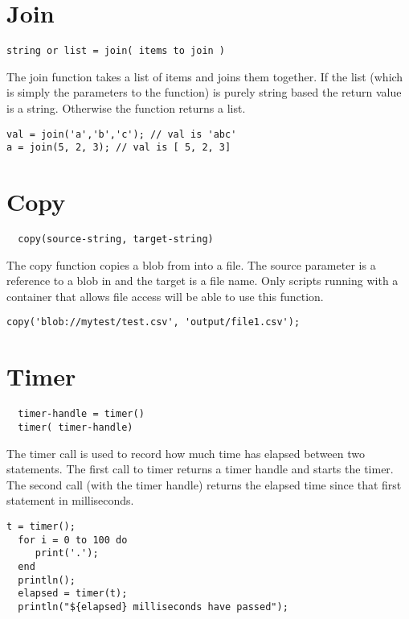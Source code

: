 \section{Join}
\begin{Verbatim}
string or list = join( items to join )
\end{Verbatim}

The join function takes a list of items and joins them together. If the
list (which is simply the parameters to the function) is purely string based the return
value is a string. Otherwise the function returns a list.

\begin{lstlisting}[caption={join example}]
val = join('a','b','c'); // val is 'abc'
a = join(5, 2, 3); // val is [ 5, 2, 3]
\end{lstlisting}


\section{Copy}
\begin{Verbatim}
  copy(source-string, target-string)
\end{Verbatim}

The copy function copies a blob from \Rapture into a file. The source parameter is
a reference to a blob in \Rapture and the target is a file name. Only scripts running
with a container that allows file access will be able to use this function.

\begin{lstlisting}[caption={copy example}]
copy('blob://mytest/test.csv', 'output/file1.csv');
\end{lstlisting}

\section{Timer}
\begin{Verbatim}
  timer-handle = timer()
  timer( timer-handle)
\end{Verbatim}

The timer call is used to record how much time has elapsed between two
\Reflex statements. The first call to timer returns a timer handle and starts
the timer. The second call (with the timer handle) returns the elapsed time since
that first statement in milliseconds.

\begin{lstlisting}[caption={timer example}]
  t = timer();
  for i = 0 to 100 do
     print('.');
  end
  println();
  elapsed = timer(t);
  println("${elapsed} milliseconds have passed");
\end{lstlisting}

